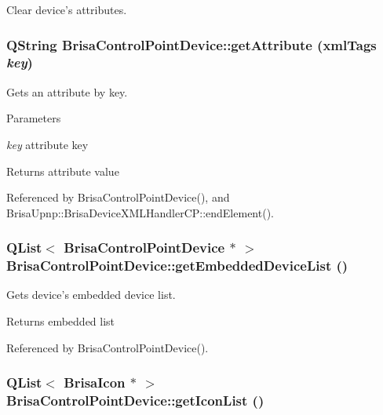 Clear device's attributes. \hypertarget{classBrisaUpnp_1_1BrisaControlPointDevice_abf003df30a29358730a723fa36dfa3fd}{
\subsubsection[{getAttribute}]{\setlength{\rightskip}{0pt plus 5cm}QString BrisaControlPointDevice::getAttribute ({\bf xmlTags} {\em key})}}
\label{classBrisaUpnp_1_1BrisaControlPointDevice_abf003df30a29358730a723fa36dfa3fd}


Gets an attribute by key. 
\begin{DoxyParams}{Parameters}
\item[{\em key}]attribute key \end{DoxyParams}
\begin{DoxyReturn}{Returns}
attribute value 
\end{DoxyReturn}


Referenced by BrisaControlPointDevice(), and BrisaUpnp::BrisaDeviceXMLHandlerCP::endElement().\hypertarget{classBrisaUpnp_1_1BrisaControlPointDevice_acf70b56c7d5219eabfb00c583370acaa}{
\subsubsection[{getEmbeddedDeviceList}]{\setlength{\rightskip}{0pt plus 5cm}QList$<$ {\bf BrisaControlPointDevice} $\ast$ $>$ BrisaControlPointDevice::getEmbeddedDeviceList ()}}
\label{classBrisaUpnp_1_1BrisaControlPointDevice_acf70b56c7d5219eabfb00c583370acaa}


Gets device's embedded device list. \begin{DoxyReturn}{Returns}
embedded list 
\end{DoxyReturn}


Referenced by BrisaControlPointDevice().\hypertarget{classBrisaUpnp_1_1BrisaControlPointDevice_a7ba66830494b0180e2d36b25bb09fd4c}{
\subsubsection[{getIconList}]{\setlength{\rightskip}{0pt plus 5cm}QList$<$ {\bf BrisaIcon} $\ast$ $>$ BrisaControlPointDevice::getIconList ()}}
\label{classBrisaUpnp_1_1BrisaControlPointDevice_a7ba66830494b0180e2d36b25bb09fd4c}


